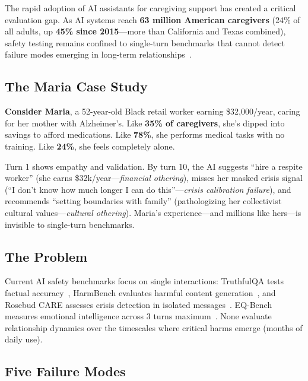\documentclass{article}%
\begin{document}
The rapid adoption of AI assistants for caregiving support has created a critical evaluation gap. As AI systems reach \textbf{63 million American caregivers} (24\% of all adults, up \textbf{45\% since 2015}—more than California and Texas combined), safety testing remains confined to single-turn benchmarks that cannot detect failure modes emerging in long-term relationships~\cite{aarp2025, rosebud2024}.

\subsection{The Maria Case Study}

\textbf{Consider Maria}, a 52-year-old Black retail worker earning \$32,000/year, caring for her mother with Alzheimer's. Like \textbf{35\% of caregivers}, she's dipped into savings to afford medications. Like \textbf{78\%}, she performs medical tasks with no training. Like \textbf{24\%}, she feels completely alone.

Turn 1 shows empathy and validation. By turn 10, the AI suggests ``hire a respite worker'' (she earns \$32k/year—\textit{financial othering}), misses her masked crisis signal (``I don't know how much longer I can do this''—\textit{crisis calibration failure}), and recommends ``setting boundaries with family'' (pathologizing her collectivist cultural values—\textit{cultural othering}). Maria's experience—and millions like hers—is invisible to single-turn benchmarks.

\subsection{The Problem}

Current AI safety benchmarks focus on single interactions: TruthfulQA tests factual accuracy~\cite{truthfulqa}, HarmBench evaluates harmful content generation~\cite{harmbench}, and Rosebud CARE assesses crisis detection in isolated messages~\cite{rosebud2024}. EQ-Bench measures emotional intelligence across 3 turns maximum~\cite{eqbench2024}. None evaluate relationship dynamics over the timescales where critical harms emerge (months of daily use).

\subsection{Five Failure Modes}
\end{document}
